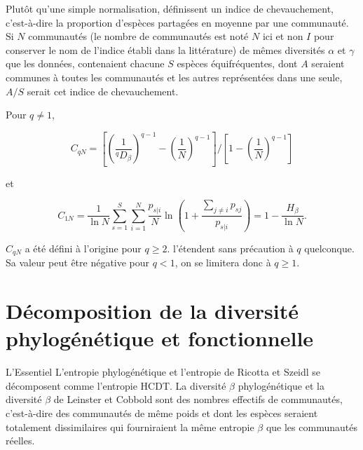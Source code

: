 \documentclass[
  11pt,
  french,
  a4paper,
  extrafontsizes,onecolumn,openright
  ]{memoir}
\newenvironment{Summary}
  {\begin{bclogo}[logo=\bctrombone, noborder=true, couleur=lightgray!50]{L'Essentiel}\parindent0pt}
  {\end{bclogo}}
\begin{document}
Plutôt qu'une simple normalisation, \textcite{Chao2008} définissent un indice de chevauchement, c'est-à-dire la proportion d'espèces partagées en moyenne par une communauté.
Si \(N\) communautés (le nombre de communautés est noté \(N\) ici et non \(I\) pour conserver le nom de l'indice établi dans la littérature) de mêmes diversités \(\alpha\) et \(\gamma\) que les données, contenaient chacune \(S\) espèces équifréquentes, dont \(A\) seraient communes à toutes les communautés et les autres représentées dans une seule, \(A/S\) serait cet indice de chevauchement.

Pour \(q\ne 1\),

\begin{equation}
  \label{eq:Chao2008q}
  C_{qN} = {\left[{\left(\frac{1}{^{q}\!D_{\beta}}\right)}^{q-1}-{\left(\frac{1}{N}\right)}^{q-1}\right]}/{\left[1-{\left(\frac{1}{N}\right)}^{q-1}\right]}
\end{equation}

et

\begin{equation}
  \label{eq:C1N}
  C_{1N} 
  =\frac{1}{\ln{N}}\sum^S_{s=1}{\sum^N_{i=1}{\frac{p_{s|i}}{N}\ln\left(1+\frac{\sum_{j\ne i}{p_{sj}}}{p_{s|i}}\right)}}
  =1-\frac{H_{\beta}}{\ln{N}}.
\end{equation}

\(C_{qN}\) a été défini à l'origine pour \(q\ge 2\).
\textcite{Chao2012a} l'étendent sans précaution à \(q\) quelconque.
Sa valeur peut être négative pour \(q<1\), on se limitera donc à \(q \ge 1\).

\hypertarget{duxe9composition-de-la-diversituxe9-phyloguxe9nuxe9tique-et-fonctionnelle}{%
\chapter{Décomposition de la diversité phylogénétique et fonctionnelle}\label{duxe9composition-de-la-diversituxe9-phyloguxe9nuxe9tique-et-fonctionnelle}}

\scriptsize

\begin{Summary}
L'entropie phylogénétique et l'entropie de Ricotta et Szeidl se
décomposent comme l'entropie HCDT. La diversité \(\beta\) phylogénétique
et la diversité \(\beta\) de Leinster et Cobbold sont des nombres
effectifs de communautés, c'est-à-dire des communautés de même poids et
dont les espèces seraient totalement dissimilaires qui fourniraient la
même entropie \(\beta\) que les communautés réelles.
\end{Summary}
\end{document}

